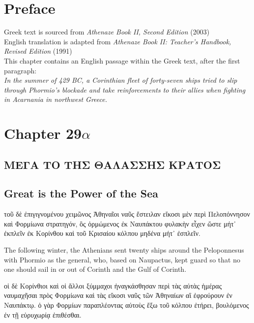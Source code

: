 \documentclass{article}
\begin{document}
\section{Preface}

Greek text is sourced from \emph{Athenaze Book II, Second Edition} (2003) \\
English translation is adapted from \emph{Athenaze Book II: Teacher's Handbook, Revised Edition} (1991) \\

This chapter contains an English passage within the Greek text, after the first paragraph:\\
\em In the summer of 429 BC, 
a Corinthian fleet of forty-seven ships tried to slip through Phormio's blockade
and take reinforcements to their allies when fighting in Acarnania in northwest Greece.
\em

\section{Chapter 29$\alpha$}

\subsection*{\textgreek{ΜΕΓΑ ΤΟ ΤΗΣ ΘΑΛΑΣΣΗΣ ΚΡΑΤΟΣ}}
\subsection*{Great is the Power of the Sea}

\begin{greek}
τοῦ δὲ ἐπιγιγνομένου χειμῶνος Ἀθηναῖοι ναῦς ἔστειλαν εἴκοσι μὲν περὶ Πελοπόννησον
καὶ Φορμίωνα στρατηγόν, ὃς ὁρμώμενος ἐκ Ναυπάκτου φυλακὴν εἶχεν ὥστε μήτ᾿ ἐκπλεῖν ἐκ Κορίνθου
καὶ τοῦ Κρισαίου κόλπου μηδένα μήτ᾿ ἐσπλεῖν. \\
\end{greek}


The following winter, the Athenians sent twenty ships around the Peloponnesus
with Phormio as the general, who, based on Naupactus, kept guard
so that no one should sail in or out of Corinth and the Gulf of Corinth. \\ %


\begin{greek}
οἱ δὲ Κορίνθιοι καὶ οἱ ἄλλοι ξύμμαχοι ἠναγκάσθησαν
περὶ τὰς αὐτὰς ἡμέρας ναυμαχῆσαι πρὸς Φορμίωνα
καὶ τὰς εἴκοσι ναῦς τῶν Ἀθηναίων αἳ ἐφρούρουν ἐν Ναυπάκτῳ.
ὁ γὰρ Φορμίων παραπλέοντας αὐτοὺς ἔξω τοῦ κόλπου ἐτήρει,
βουλόμενος ἐν τῇ εὐρυχωρίᾳ ἐπιθέσθαι. \\
\end{greek}
\end{document}
